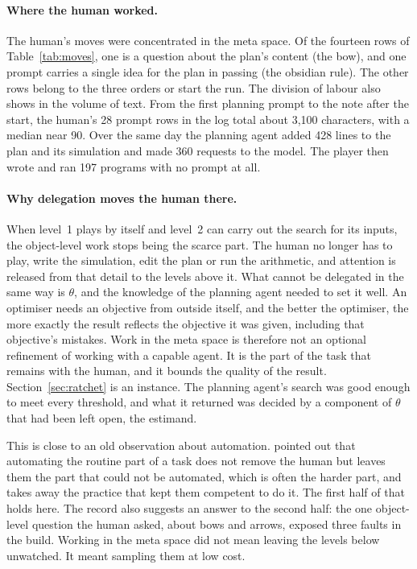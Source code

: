 \documentclass[11pt,a4paper]{article}
\begin{document}
\paragraph{Where the human worked.} The human's moves were concentrated in the meta space. Of the fourteen rows of Table~\ref{tab:moves}, one is a question about the plan's content (the bow), and one prompt carries a single idea for the plan in passing (the obsidian rule). The other rows belong to the three orders or start the run. The division of labour also shows in the volume of text. From the first planning prompt to the note after the start, the human's 28 prompt rows in the log total about 3,100 characters, with a median near 90. Over the same day the planning agent added 428 lines to the plan and its simulation and made 360 requests to the model. The player then wrote and ran 197 programs with no prompt at all.

\paragraph{Why delegation moves the human there.} When level~1 plays by itself and level~2 can carry out the search for its inputs, the object-level work stops being the scarce part. The human no longer has to play, write the simulation, edit the plan or run the arithmetic, and attention is released from that detail to the levels above it. What cannot be delegated in the same way is $\theta$, and the knowledge of the planning agent needed to set it well. An optimiser needs an objective from outside itself, and the better the optimiser, the more exactly the result reflects the objective it was given, including that objective's mistakes. Work in the meta space is therefore not an optional refinement of working with a capable agent. It is the part of the task that remains with the human, and it bounds the quality of the result. Section~\ref{sec:ratchet} is an instance. The planning agent's search was good enough to meet every threshold, and what it returned was decided by a component of $\theta$ that had been left open, the estimand.

This is close to an old observation about automation. \citet{bainbridge1983} pointed out that automating the routine part of a task does not remove the human but leaves them the part that could not be automated, which is often the harder part, and takes away the practice that kept them competent to do it. The first half of that holds here. The record also suggests an answer to the second half: the one object-level question the human asked, about bows and arrows, exposed three faults in the build. Working in the meta space did not mean leaving the levels below unwatched. It meant sampling them at low cost.
\end{document}

